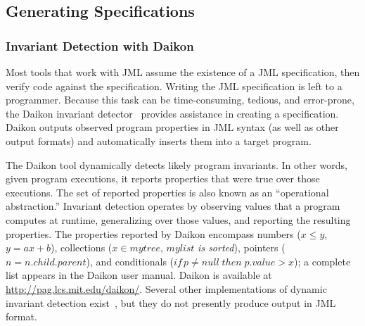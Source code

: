 %
%

\subsection{Generating Specifications} 

\subsubsection{Invariant Detection with Daikon}
\label{daikon}

Most tools that work with JML assume the existence of a JML
specification, then verify code against the specification.  Writing
the JML specification is left to a programmer.  Because this task can
be time-consuming, tedious, and error-prone, the Daikon invariant
detector~\cite{Ernst2000:PhD,ErnstCGN2001:TSE} provides assistance in
creating a specification.  Daikon outputs observed program properties
in JML syntax (as well as other output formats) and automatically inserts
them into a target program.

The Daikon tool dynamically detects likely program invariants.  In
other words, given program executions, it reports properties that were
true over those executions.  The set of reported properties is also
known as an ``operational abstraction.''  Invariant detection operates
by observing values that a program computes at runtime, generalizing
over those values, and reporting the resulting properties.  The
properties reported by Daikon encompass numbers ($x \le y$, $y=ax+b$),
collections ($x \in \mathit{mytree}$, $\mathit{mylist}$ {\it is
  sorted\/}), pointers ($\mathit{n} = \mathit{n.child.parent}$),
and conditionals ($\mathit{if\,} p \neq \mathit{null\; then\; p.value}
> x$); a complete list appears in the Daikon user manual.  Daikon is
available at {\small\url{http://pag.lcs.mit.edu/daikon/}}.  Several
other implementations of dynamic invariant detection
exist~\cite{HangalL02,PytlikRKR2003,HenkelD2003}, but they do not
presently produce output in JML format.

